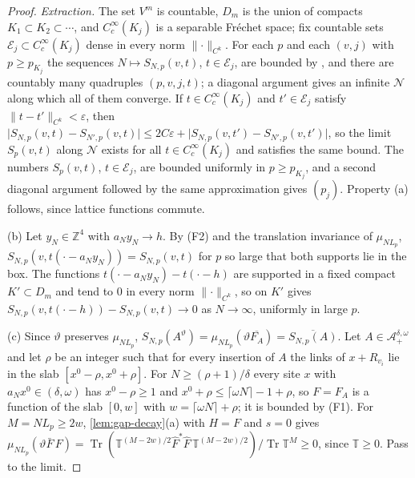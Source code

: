 \documentclass[11pt,a4paper]{amsart}
\theoremstyle{definition}
\theoremstyle{remark}
\numberwithin{equation}{section}
\DeclareMathOperator{\Tr}{Tr}        %
\newcommand{\Z}{\mathbb{Z}}          %
\newcommand{\norm}[1]{\lVert #1\rVert}     %
\newcommand{\abs}[1]{\lvert #1\rvert}      %
\newcommand{\TT}{\mathbb{T}}               %
\newcommand{\UVB}{\text{\upshape(UVB)}}             %
\newcommand{\aN}{a_N}                      %
\newcommand{\Lp}{L_p}                      %
\begin{document}
\begin{proof}
\emph{Extraction.} The set $V^m$ is countable, $D_m$ is the union of compacts $K_1\subset K_2\subset\cdots$, and $C^\infty_c(K_j)$ is a separable Fr\'echet space; fix countable sets $\mathcal E_j\subset C^\infty_c(K_j)$ dense in every norm $\norm{\cdot}_{C^k}$. For each $p$ and each $(v,j)$ with $p\ge p_{K_j}$ the sequences $N\mapsto S_{N,p}(v,t)$, $t\in\mathcal E_j$, are bounded by \UVB, and there are countably many quadruples $(p,v,j,t)$; a diagonal argument gives an infinite $\mathcal N$ along which all of them converge. If $t\in C^\infty_c(K_j)$ and $t'\in\mathcal E_j$ satisfy $\norm{t-t'}_{C^k}<\varepsilon$, then $\abs{S_{N,p}(v,t)-S_{N',p}(v,t)}\le2C\varepsilon+\abs{S_{N,p}(v,t')-S_{N',p}(v,t')}$, so the limit $S_p(v,t)$ along $\mathcal N$ exists for all $t\in C^\infty_c(K_j)$ and satisfies the same bound. The numbers $S_p(v,t)$, $t\in\mathcal E_j$, are bounded uniformly in $p\ge p_{K_j}$, and a second diagonal argument followed by the same approximation gives $(p_j)$. Property (a) follows, since lattice functions commute.

(b) Let $y_N\in\Z^4$ with $\aN y_N\to h$. By (F2) and the translation invariance of $\mu_{N\Lp}$, $S_{N,p}(v,t(\cdot-\aN y_N))=S_{N,p}(v,t)$ for $p$ so large that both supports lie in the box. The functions $t(\cdot-\aN y_N)-t(\cdot-h)$ are supported in a fixed compact $K'\subset D_m$ and tend to $0$ in every norm $\norm{\cdot}_{C^k}$, so \UVB{} on $K'$ gives $S_{N,p}(v,t(\cdot-h))-S_{N,p}(v,t)\to0$ as $N\to\infty$, uniformly in large $p$.

(c) Since $\vartheta$ preserves $\mu_{N\Lp}$, $S_{N,p}(A^\vartheta)=\mu_{N\Lp}(\vartheta\overline{F_A})=\overline{S_{N,p}(A)}$. Let $A\in\mathcal A_+^{\delta,\omega}$ and let $\rho$ be an integer such that for every insertion of $A$ the links of $x+R_{v_i}$ lie in the slab $[x^0-\rho,x^0+\rho]$. For $N\ge(\rho+1)/\delta$ every site $x$ with $\aN x^0\in(\delta,\omega)$ has $x^0-\rho\ge1$ and $x^0+\rho\le\lceil\omega N\rceil-1+\rho$, so $F=F_A$ is a function of the slab $[0,w]$ with $w=\lceil\omega N\rceil+\rho$; it is bounded by (F1). For $M=N\Lp\ge2w$, \cref{lem:gap-decay}(a) with $H=F$ and $s=0$ gives $\mu_{N\Lp}(\vartheta\bar F\,F)=\Tr(\TT^{(M-2w)/2}\hat F^*\hat F\,\TT^{(M-2w)/2})/\Tr\TT^M\ge0$, since $\TT\ge0$. Pass to the limit.


\end{proof}
\end{document}
